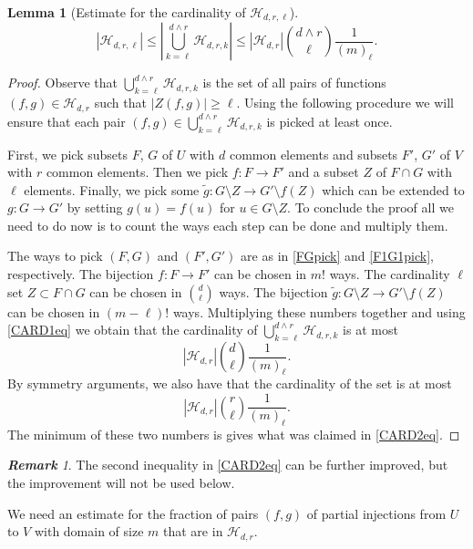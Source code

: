 \documentclass[reqno]{amsart}
\theoremstyle{theorem}
\newtheorem{lemma}[theorem]{Lemma}
\theoremstyle{definition}
\theoremstyle{remark}
\newtheorem{remark}[theorem]{\bf\em Remark}
\def\HH{\mathscr{H}}
\newcommand{\1}{{\text{\Large $\mathfrak 1$}}}	%
\numberwithin{equation}{section}
\begin{document}
\begin{lemma}[Estimate for the cardinality of $\HH_{d,r,\ell}$]
\label{CARD2lem}
\begin{equation}
\label{CARD2eq}
|\HH_{d,r,\ell}| \le \left| \bigcup_{k=\ell}^{d\wedge r} \HH_{d,r,k} \right|
\le 
|\HH_{d,r}| \binom{d \wedge r}{\ell} \frac{1}{(m)_\ell}.
\end{equation}
\end{lemma}
\begin{proof}
Observe that
$\bigcup_{k=\ell}^{d \wedge r} \HH_{d, r, k}$
is the set of all pairs of functions $(f, g) \in \HH_{d, r}$ such that 
$|Z(f, g)| \ge \ell$. 
Using the following procedure we will ensure that each pair 
$(f, g) \in \bigcup_{k=\ell}^{d \wedge r} \HH_{d, r, k}$ 
is picked at least once.

First, we pick subsets $F$, $G$ of $U$ with $d$ common elements 
and subsets $F'$, $G'$ of $V$ with $r$ common elements. 
Then we pick $f: F \rightarrow F'$ and
a subset $Z$ of $F \cap G$ with $\ell$ elements.  
Finally, we pick some
$\tilde{g}: G \setminus Z \rightarrow G' \setminus f(Z)$ 
which can be extended to $g: G \rightarrow G'$ by setting 
$g(u) = f(u)$ for $u \in G \setminus Z$.
To conclude the proof all we need to do now is to count the ways each step can
be done and multiply them.

The ways to pick $(F,G)$ and $(F',G')$ 
are as in \eqref{FGpick} and \eqref{F1G1pick}, respectively.
The bijection $f: F \to F'$ can be chosen in $m!$ ways.
The cardinality $\ell$ set $Z \subset F \cap G$ can be chosen in $\binom{d}{\ell}$ ways.
The bijection $\tilde{g}: G \setminus Z \rightarrow G' \setminus f(Z)$ 
can be chosen in $(m - \ell)!$ ways.
Multiplying these numbers together and using \eqref{CARD1eq} we obtain that the 
cardinality of $\bigcup_{k=\ell}^{d \wedge r} \HH_{d, r, k}$ is at most
\[
|\HH_{d, r}| \binom{d}{\ell} \frac{1}{(m)_{\ell}}.
\]
By symmetry arguments, we also have that the cardinality of the set is at most
\[
|\HH_{d, r}| \binom{r}{\ell} \frac{1}{(m)_{\ell}}.
\]
The minimum of these two numbers is gives what was claimed in \eqref{CARD2eq}.
\end{proof}

\begin{remark}
The second inequality in \eqref{CARD2eq}
can be further improved, but the improvement will not be used below.
\end{remark}

We need an estimate for the fraction of pairs $(f,g)$ of
partial injections from $U$ to $V$ with domain of size $m$ that
are in $\HH_{d,r}$. 
\end{document}

